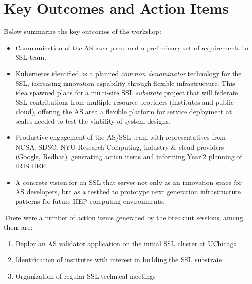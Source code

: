 \documentclass[11pt,letterpaper,fleqn]{article}
\begin{document}
\section{Key Outcomes and Action Items}
\vspace{0.2cm}
Below summarize the key outcomes of the workshop:
\begin{itemize}
  \item Communication of the AS area plans and a preliminary set of requirements to SSL team.
  \item Kubernetes identified as a planned {\it common denominator} technology for the SSL, increasing innovation capability through flexible infrastructure.  This idea spawned plans for a multi-site SSL {\it substrate} project that will federate SSL contributions from multiple resource providers (institutes and public cloud), offering the AS area a flexible platform for service deployment at scales needed to test the viability of system designs.
  \item Productive engagement of the AS/SSL team with representatives from NCSA, SDSC, NYU Research Computing, industry \& cloud providers (Google, Redhat), generating action items and informing Year 2 planning of IRIS-HEP.
  \item A concrete vision for an SSL that serves not only as an innovation space for AS developers, but as a testbed to prototype next generation infrastructure patterns for future HEP computing environments.
\end{itemize}
There were a number of action items generated by the breakout sessions, among them are:
\begin{enumerate}
  \item Deploy an AS validator application on the initial SSL cluster at UChicago
  \item Identification of institutes with interest in building the SSL substrate
  \item Organization of regular SSL technical meetings
\end{enumerate}
\end{document}
